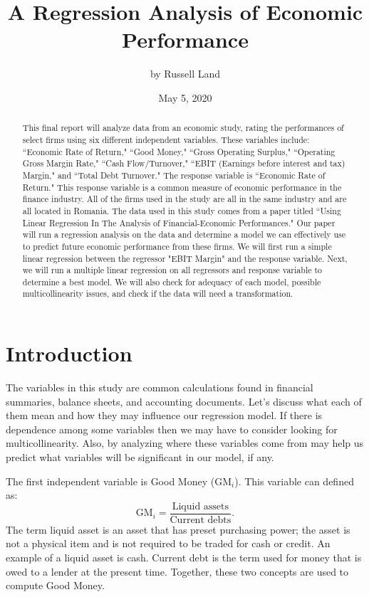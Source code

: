 \documentclass[12pt,letterpaper]{article}
\title{A Regression Analysis of Economic Performance}
\author{by Russell Land}
\date{May 5, 2020}
\begin{document}
\maketitle

\begin{abstract}
This final report will analyze data from an economic study, rating the performances of select firms using six different independent variables. These variables include: ``Economic Rate of Return," ``Good Money," ``Gross Operating Surplus," ``Operating Gross Margin Rate," ``Cash Flow/Turnover," ``EBIT (Earnings before interest and tax) Margin," and ``Total Debt Turnover." The response variable is ``Economic Rate of Return." This response variable is a common measure of economic performance in the finance industry. All of the firms used in the study are all in the same industry and are all located in Romania. The data used in this study comes from a paper titled ``Using Linear Regression In The Analysis of Financial-Economic Performances." \cite{paper} Our paper will run a regression analysis on the data and determine a model we can effectively use to predict future economic performance from these firms. We will first run a simple linear regression between the regressor "EBIT Margin" and the response variable. Next, we will run a multiple linear regression on all regressors and response variable to determine a best model. We will also check for adequacy of each model, possible multicollinearity issues, and check if the data will need a transformation.
\end{abstract}

\section*{Introduction}

The variables in this study are common calculations found in financial summaries, balance sheets, and accounting documents. Let's discuss what each of them mean and how they may influence our regression model. If there is dependence among some variables then we may have to consider looking for multicollinearity. Also, by analyzing where these variables come from may help us predict what variables will be significant in our model, if any.

\setlength\parindent{24pt} The first independent variable is Good Money ($\text{GM}_i$). This variable can defined as: $$\text{GM}_i=\frac{\text{Liquid assets}}{\text{Current debts}}.$$ The term liquid asset is an asset that has preset purchasing power; the asset is not a physical item and is not required to be traded for cash or credit. An example of a liquid asset is cash. Current debt is the term used for money that is owed to a lender at the present time. Together, these two concepts are used to compute Good Money.
\end{document}
